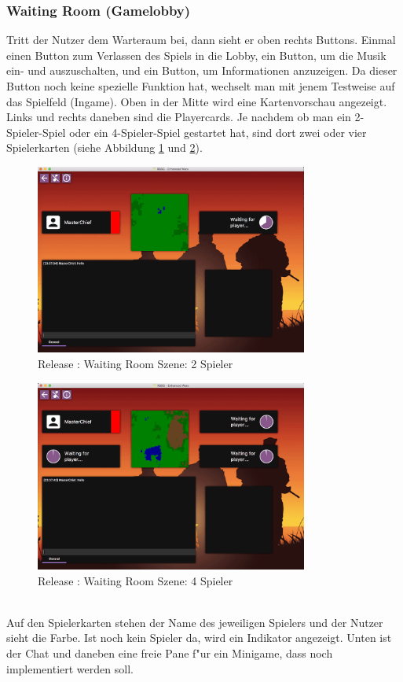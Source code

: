 \documentclass[12pt, titlepage]{scrartcl}
\newcommand{\RN}[1]{%
	\textup{\uppercase\expandafter{\romannumeral#1}}%
}
\begin{document}
	        \subsubsection{Waiting Room (Gamelobby)} \label{WAITING_ROOM}
                Tritt der Nutzer dem Warteraum bei, dann sieht er oben rechts Buttons. Einmal einen Button zum Verlassen des Spiels in die Lobby, ein Button, um die Musik ein- und auszuschalten, und ein Button, um Informationen anzuzeigen. Da dieser Button noch keine spezielle Funktion hat, wechselt man mit jenem Testweise auf das Spielfeld (Ingame). Oben in der Mitte wird eine Kartenvorschau angezeigt. Links und rechts daneben sind die Playercards. Je nachdem ob man ein 2- Spieler-Spiel oder ein 4-Spieler-Spiel gestartet hat, sind dort zwei oder vier Spielerkarten (siehe Abbildung \ref{Waiting_Room_2} und \ref{Waiting_Room_4}). \\
                \begin{figure}[H] 
    				\centering
    				\includegraphics[width=0.8\textwidth]{images/old_state/waiting_room/2Player.png}
    				\caption{Release \RN{2}: Waiting Room Szene: 2 Spieler}
    				\label{Waiting_Room_2}
			    \end{figure}
			    \begin{figure}[H] 
    				\centering
    				\includegraphics[width=0.8\textwidth]{images/old_state/waiting_room/4Player.png}
    				\caption{Release \RN{2}: Waiting Room Szene: 4 Spieler}
    				\label{Waiting_Room_4}
			    \end{figure}
			    \ \\ Auf den Spielerkarten stehen der Name des jeweiligen Spielers und der Nutzer sieht die Farbe. Ist noch kein Spieler da, wird ein Indikator angezeigt. Unten ist der Chat und daneben eine freie Pane f"ur ein Minigame, dass noch implementiert werden soll.
\end{document}
